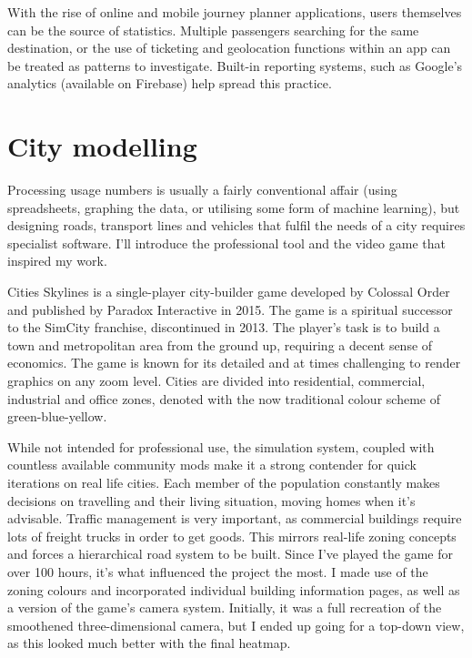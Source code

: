 With the rise of online and mobile journey planner applications, users themselves can be the source of statistics. Multiple passengers searching for the same destination, or the use of ticketing and geolocation functions within an app can be treated as patterns to investigate. Built-in reporting systems, such as Google's analytics (available on Firebase) help spread this practice.

\section{City modelling}

Processing usage numbers is usually a fairly conventional affair (using spreadsheets, graphing the data, or utilising some form of machine learning), but designing roads, transport lines and vehicles that fulfil the needs of a city requires specialist software. I'll introduce the professional tool and the video game that inspired my work.

Cities Skylines is a single-player city-builder game developed by Colossal Order and published by Paradox Interactive in 2015. The game is a spiritual successor to the SimCity franchise, discontinued in 2013. The player's task is to build a town and metropolitan area from the ground up, requiring a decent sense of economics. The game is known for its detailed and at times challenging to render graphics on any zoom level. Cities are divided into residential, commercial, industrial and office zones, denoted with the now traditional colour scheme of green-blue-yellow.

While not intended for professional use, the simulation system, coupled with countless available community mods make it a strong contender for quick iterations on real life cities. Each member of the population constantly makes decisions on travelling and their living situation, moving homes when it's advisable. Traffic management is very important, as commercial buildings require lots of freight trucks in order to get goods. This mirrors real-life zoning concepts and forces a hierarchical road system to be built. Since I've played the game for over 100 hours, it's what influenced the project the most. I made use of the zoning colours and incorporated individual building information pages, as well as a version of the game's camera system. Initially, it was a full recreation of the smoothened three-dimensional camera, but I ended up going for a top-down view, as this looked much better with the final heatmap.

